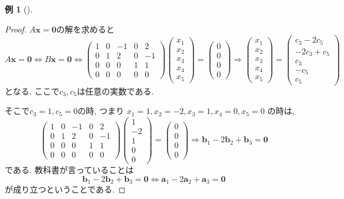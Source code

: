 \documentclass[dvipdfmx,a4paper,11pt]{article} %
\theoremstyle{definition}
\newtheorem{eg}[thm]{例}
\begin{document}
\begin{eg}[{\cite[例題4.3.1]{M}}]
\begin{proof}
$A\bm{x}=\bm{0}$の解を求めると
$$
A\bm{x}=\bm{0}
\Longleftrightarrow B\bm{x}=\bm{0}
\Longleftrightarrow
\begin{pmatrix}
1&0&-1&0&2\\
0&1&2&0&-1\\
0&0&0&1&1\\
0&0&0&0&0
\end{pmatrix}
\begin{pmatrix}
x_1\\x_2\\x_3\\x_4\\x_5
\end{pmatrix}
=
\begin{pmatrix}
0\\0\\0\\0
\end{pmatrix}
\Longrightarrow
\begin{pmatrix}
x_1\\x_2\\x_3\\x_4\\x_5
\end{pmatrix}
=
\begin{pmatrix}
c_3 - 2c_5\\-2c_3+c_5 \\c_3\\-c_5\\c_5
\end{pmatrix}
$$
となる. ここで$c_3, c_5$は任意の実数である. 

そこで$c_3=1, c_5=0$の時, つまり
$x_1=1, x_2=-2, x_3=1, x_4=0, x_5=0$
の時は, 
$$
\begin{pmatrix}
1&0&-1&0&2\\
0&1&2&0&-1\\
0&0&0&1&1\\
0&0&0&0&0
\end{pmatrix}
\begin{pmatrix}
1\\-2\\1\\0\\0
\end{pmatrix}
=
\begin{pmatrix}
0\\0\\0\\0
\end{pmatrix}
\Longrightarrow
\bm{b}_1-2\bm{b}_2+\bm{b}_3=\bm{0} 
$$
である. 教科書が言っていることは
$$
\bm{b}_1-2\bm{b}_2+\bm{b}_3=\bm{0} 
\Longleftrightarrow
\bm{a}_1-2\bm{a}_2+\bm{a}_3=\bm{0}
$$
が成り立つということである. 


\end{proof}
\end{eg}
\end{document}
